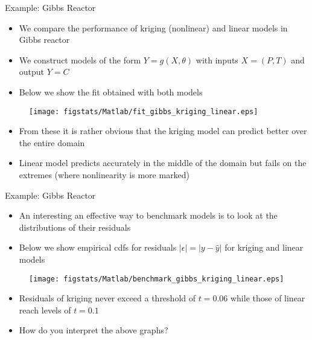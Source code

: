 \documentclass[9pt]{beamer}
\begin{document}
%
\begin{frame}{Example: Gibbs Reactor}

\begin{itemize}
\item We compare the performance of kriging (nonlinear) and linear models in Gibbs reactor
\item We construct models of the form $Y=g(X,\theta)$ with inputs $X=(P,T)$ and output $Y=C$ 
\item Below we show the fit obtained with both models 
\end{itemize}

\begin{figure}[!htb]
    \centering
	\texttt{[image: figstats/Matlab/fit\_gibbs\_kriging\_linear.eps]}
\end{figure}

\begin{itemize}
\item From these it is rather obvious that the kriging model can predict better over the entire domain
\item Linear model predicts accurately in the middle of the domain but fails on the extremes (where nonlinearity is more marked)
\end{itemize}

\end{frame}

%
\begin{frame}{Example: Gibbs Reactor}

\begin{itemize}
\item An interesting an effective way to benchmark models is to look at the distributions of their residuals
\item Below we show empirical cdfs for residuals $|\epsilon|=|y-\hat{y}|$ for kriging and linear models
\end{itemize}

\begin{figure}[!htb]
    \centering
	\texttt{[image: figstats/Matlab/benchmark\_gibbs\_kriging\_linear.eps]}
\end{figure}

\begin{itemize}
\item Residuals of kriging never exceed a threshold of $t=0.06$ while those of linear reach levels of $t=0.1$
\item How do you interpret the above graphs? 
\end{itemize}

\end{frame}
\end{document}
